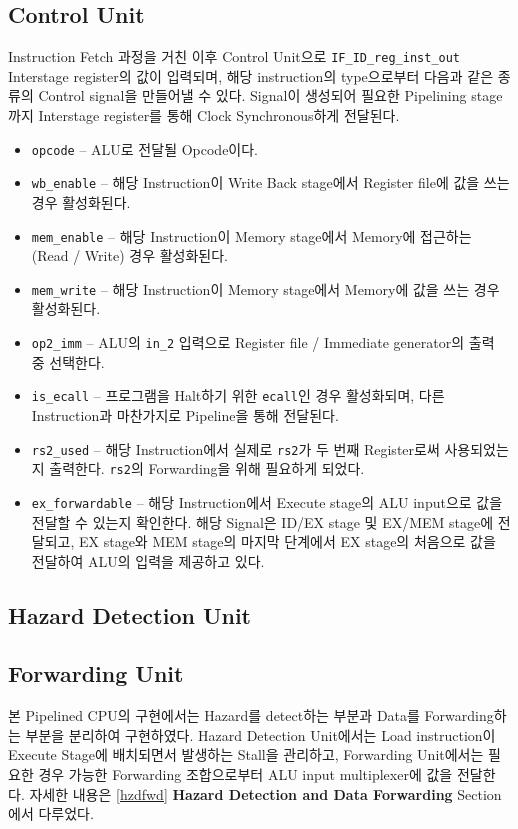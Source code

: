 \documentclass{scrartcl}
\begin{document}
\subsection{Control Unit}
Instruction Fetch 과정을 거친 이후 Control Unit으로 \texttt{IF\_ID\_reg\_inst\_out} Interstage register의 값이 입력되며, 해당 instruction의 type으로부터
다음과 같은 종류의 Control signal을 만들어낼 수 있다. Signal이 생성되어 필요한 Pipelining stage까지 Interstage register를 통해 Clock Synchronous하게 전달된다.

\begin{itemize}
  \item \texttt{opcode} -- ALU로 전달될 Opcode이다.
  \item \texttt{wb\_enable} -- 해당 Instruction이 Write Back stage에서 Register file에 값을 쓰는 경우 활성화된다.
  \item \texttt{mem\_enable} -- 해당 Instruction이 Memory stage에서 Memory에 접근하는 (Read / Write) 경우 활성화된다.
  \item \texttt{mem\_write} -- 해당 Instruction이 Memory stage에서 Memory에 값을 쓰는 경우 활성화된다.
  \item \texttt{op2\_imm} -- ALU의 \texttt{in\_2} 입력으로 Register file / Immediate generator의 출력 중 선택한다.
  \item \texttt{is\_ecall} -- 프로그램을 Halt하기 위한 \texttt{ecall}인 경우 활성화되며, 다른 Instruction과 마찬가지로 Pipeline을 통해 전달된다.
  \item \texttt{rs2\_used} -- 해당 Instruction에서 실제로 \texttt{rs2}가 두 번째 Register로써 사용되었는지 출력한다. \texttt{rs2}의 Forwarding을 위해 필요하게 되었다.
  \item \texttt{ex\_forwardable} -- 해당 Instruction에서 Execute stage의 ALU input으로 값을 전달할 수 있는지 확인한다. 해당 Signal은 ID/EX stage 및 EX/MEM stage에 전달되고, EX stage와 MEM stage의 마지막 단계에서 EX stage의 처음으로 값을 전달하여 ALU의 입력을 제공하고 있다.
\end{itemize}

\subsection{Hazard Detection Unit}
\subsection{Forwarding Unit}
본 Pipelined CPU의 구현에서는 Hazard를 detect하는 부분과 Data를 Forwarding하는 부분을 분리하여 구현하였다.
Hazard Detection Unit에서는 Load instruction이 Execute Stage에 배치되면서 발생하는 Stall을 관리하고, Forwarding Unit에서는 필요한 경우 가능한 Forwarding 조합으로부터 ALU input multiplexer에 값을 전달한다.
자세한 내용은 \ref{hzdfwd} \textsf{\textbf{Hazard Detection and Data Forwarding}} Section 에서 다루었다.
\end{document}
